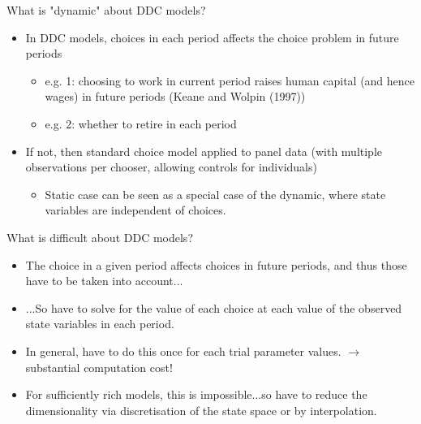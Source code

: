 \documentclass[aspectratio=169]{beamer}
\begin{document}
	\begin{frame}{What is "dynamic" about DDC models?}
		\begin{itemize}
			\itemsep1em
			\item In DDC models, choices in each period affects the choice problem in future periods
			\pause
			
			\begin{itemize}
				\itemsep1em
				\item e.g. 1: choosing to work in current period raises human capital (and hence wages) in future periods (Keane and Wolpin (1997))
				\item e.g. 2: whether to retire in each period
			\end{itemize}
			\pause
			
			\item If not, then standard choice model applied to panel data (with multiple observations per chooser, allowing controls for individuals)
			\pause
			
			\begin{itemize}
				\itemsep1em
				\item Static case can be seen as a special case of the dynamic, where state variables are independent of choices. 
			\end{itemize}
		\end{itemize}
	\end{frame}
	
	\begin{frame}{What is difficult about DDC models?}
		\begin{itemize}
			\itemsep1em
			\item The choice in a given period affects choices in future periods, and thus those have to be taken into account...
			\item ...So have to solve for the value of each choice at each value of the observed state variables in each period.
			\pause
			\item In general, have to do this once for each trial parameter values. $\rightarrow$ substantial computation cost!
			\item For sufficiently rich models, this is impossible...so have to reduce the dimensionality via discretisation of the state space or by interpolation.
		\end{itemize}
	\end{frame}
	
\end{document}
